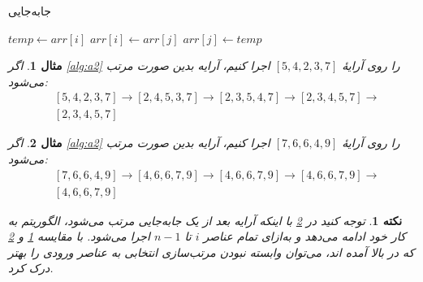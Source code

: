 \documentclass[12pt]{article}
\newtheorem{remark}{نکته}
\newtheorem{example}{مثال}
\begin{document}
\begin{algorithm}[H]
  \caption{جابه‌جایی}
  \label{alg:a3}
  \begin{latin}
    \begin{algorithmic}[1]
      \State $temp \gets arr[i]$
      \State $arr[i] \gets arr[j]$
      \State $arr[j] \gets temp$
      \EndProcedure
    \end{algorithmic}
  \end{latin}
\end{algorithm}

\begin{example}
  \label{ex:e2}
  اگر
  \cref{alg:a2}
  را روی آرایهٔ
  $[5, 4, 2, 3, 7]$
  اجرا کنیم،
  آرایه بدین صورت مرتب می‌شود:
  \begin{align*}
     & [5, 4, 2, 3, 7] \rightarrow [2, 4, 5, 3, 7] \rightarrow
    [2, 3, 5, 4, 7] \rightarrow [2, 3, 4, 5, 7] \rightarrow    \\
     & [2, 3, 4, 5, 7]
  \end{align*}
\end{example}

\begin{example}
  \label{ex:e3}
  اگر
  \cref{alg:a2}
  را روی آرایهٔ
  $[7, 6, 6, 4, 9]$
  اجرا کنیم،
  آرایه بدین صورت مرتب می‌شود:
  \begin{align*}
     & [7, 6, 6, 4, 9] \rightarrow [4, 6, 6, 7, 9] \rightarrow
    [4, 6, 6, 7, 9] \rightarrow [4, 6, 6, 7, 9] \rightarrow    \\
     & [4, 6, 6, 7, 9]
  \end{align*}
\end{example}

\begin{remark}
  توجه کنید در
  \cref{ex:e3}
  با اینکه آرایه بعد از یک جابه‌جایی مرتب می‌شود،
  الگوریتم به کار خود ادامه می‌دهد و به‌ازای تمام عناصر
  $i$
  تا
  $n-1$
  اجرا می‌شود.
  با مقایسه
  \cref{ex:e2}
  و
  \cref{ex:e3}
  که در بالا آمده اند،
  می‌توان وابسته نبودن مرتب‌سازی انتخابی به عناصر ورودی را بهتر درک کرد.
\end{remark}

{
\fontsize{12pt}{10pt}\selectfont


}
\end{document}
